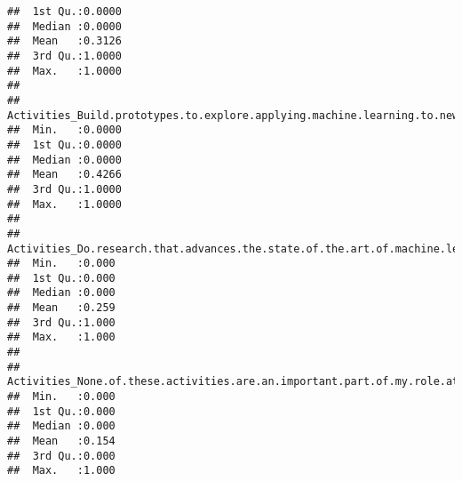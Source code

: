 \documentclass[
]{article}
\begin{document}
\begin{verbatim}
##  1st Qu.:0.0000                                                                                                             
##  Median :0.0000                                                                                                             
##  Mean   :0.3126                                                                                                             
##  3rd Qu.:1.0000                                                                                                             
##  Max.   :1.0000                                                                                                             
##                                                                                                                             
##  Activities_Build.prototypes.to.explore.applying.machine.learning.to.new.areas
##  Min.   :0.0000                                                               
##  1st Qu.:0.0000                                                               
##  Median :0.0000                                                               
##  Mean   :0.4266                                                               
##  3rd Qu.:1.0000                                                               
##  Max.   :1.0000                                                               
##                                                                               
##  Activities_Do.research.that.advances.the.state.of.the.art.of.machine.learning
##  Min.   :0.000                                                                
##  1st Qu.:0.000                                                                
##  Median :0.000                                                                
##  Mean   :0.259                                                                
##  3rd Qu.:1.000                                                                
##  Max.   :1.000                                                                
##                                                                               
##  Activities_None.of.these.activities.are.an.important.part.of.my.role.at.work
##  Min.   :0.000                                                               
##  1st Qu.:0.000                                                               
##  Median :0.000                                                               
##  Mean   :0.154                                                               
##  3rd Qu.:0.000                                                               
##  Max.   :1.000                                                               

\end{verbatim}
\end{document}
